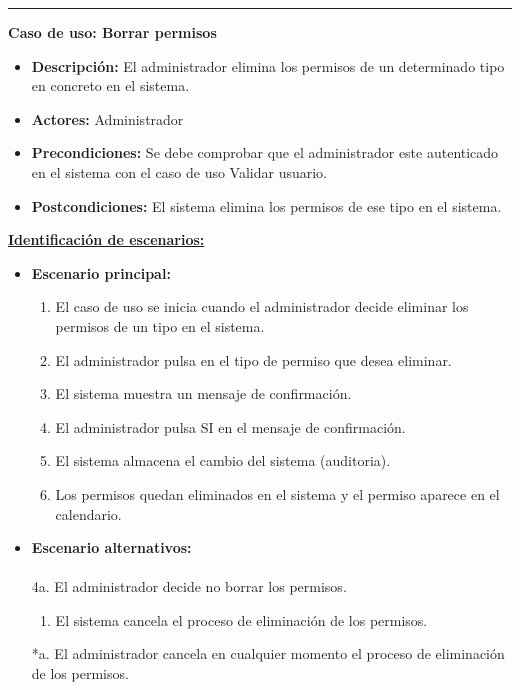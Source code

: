 \smallskip
\hrule height 1pt
\smallskip
\textbf{Caso de uso: Borrar permisos}
\begin{itemize}\renewcommand{\labelitemi}{$\cdot$}
 \item \textbf{Descripción:} El administrador elimina los permisos de un determinado tipo en concreto en el sistema.
  \item \textbf{Actores:} Administrador 
  \item \textbf{Precondiciones:} Se debe comprobar que el administrador este autenticado en el sistema con el caso de uso Validar usuario.
  \item \textbf{Postcondiciones:} El sistema elimina los permisos de ese tipo en el sistema.
\end{itemize}
\underline{\textbf{Identificación de escenarios:}}
\begin{itemize}\renewcommand{\labelitemi}{$\circ$}
 \item \textbf{Escenario principal:}
         \begin{enumerate}
          \item El caso de uso se inicia cuando el administrador decide eliminar los permisos de un tipo en el sistema.
	  \item El administrador pulsa en el tipo de permiso que desea eliminar.
	  \item El sistema muestra un mensaje de confirmación.
          \item El administrador pulsa SI en el mensaje de confirmación.
 	  \item El sistema almacena el cambio del sistema (auditoria).
          \item Los permisos quedan eliminados en el sistema y el permiso aparece en el calendario.
         \end{enumerate}
  \item \textbf{Escenario alternativos:}\\\\
		4a. El administrador decide no borrar los permisos.
  			\begin{enumerate}
  			\item El sistema cancela el proceso de eliminación de los permisos.
  			\end{enumerate}
          *a. El administrador cancela en cualquier momento el proceso de eliminación de los permisos.
\end{itemize}

